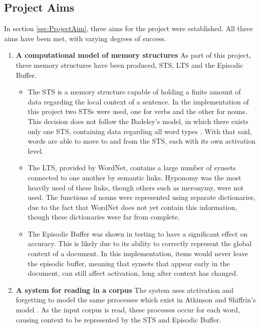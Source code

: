 \documentclass[]{article}
\begin{document}
\subsection{Project Aims}
\label{ConcAims}
In section \ref{sec:ProjectAim}, three aims for the project were established. All three aims have been met, with varying degrees of success.

\begin{enumerate}
	\item \textbf{A computational model of memory structures} \newline
		As part of this project, three memory structures have been produced, STS, LTS and the Episodic Buffer.
		\begin{itemize}
			\item The STS is a memory structure capable of holding a finite amount of data regarding the local context of a sentence. In the implementation of this project two STSs were used, one for verbs and the other for nouns. This decision does not follow the Badeley's model, in which there exists only one STS, containing data regarding all word types \cite{MemoryBaddeleyEysenkAnderson}. With that said, words are able to move to and from the STS, each with its own activation level.
			
			\item The LTS, provided by WordNet, contains a large number of synsets connected to one another by semantic links. Hyponomy was the most heavily used of these links, though others such as meronymy, were not used. The functions of nouns were represented using separate dictionaries, due to the fact that WordNet does not yet contain this information, though these dictionaries were far from complete.
			
			\item The Episodic Buffer was shown in testing to have a significant effect on accuracy. This is likely due to its ability to correctly represent the global context of a document. In this implementation, items would never leave the episodic buffer, meaning that synsets that appear early in the document, can still affect activation, long after context has changed.
		\end{itemize}		 
		
	\item \textbf{A system for reading in a corpus} \newline
		The system uses atctivation and forgetting to model the same prrocesses which exist in Atkinson and Shiffrin's model \cite{ControlProcessesSTMAtkinson}. As the input corpus is read, these processes occur for each word, causing context to be represented by the STS and Episodic Buffer. 
	

\end{enumerate}
\end{document}
